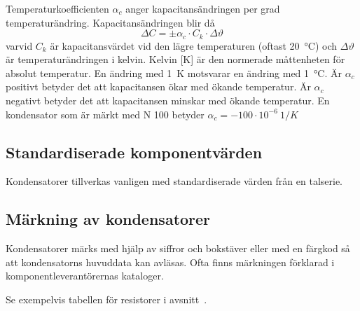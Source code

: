 Temperaturkoefficienten \(\alpha _c\) anger kapacitansändringen per grad temperaturändring.
Kapacitansändringen blir då
\[\Delta C = \pm \alpha _c \cdot C_k \cdot \Delta\vartheta\]
varvid \(C_k\) är kapacitansvärdet vid den lägre temperaturen (oftast
\qty{20}{\degreeCelsius}) och \(\Delta\vartheta\) är temperaturändringen i
kelvin.
Kelvin [K] är den normerade måttenheten för absolut temperatur.
En ändring med \qty{1}{\kelvin} motsvarar en ändring med \qty{1}{\degreeCelsius}.
Är \(\alpha _c\) positivt betyder det att kapacitansen ökar med ökande
temperatur.
Är \(\alpha _c\) negativt betyder det att kapacitansen minskar med ökande
temperatur.
En kondensator som är märkt med N 100 betyder
\(\alpha _c = -100 \cdot 10^{-6}\ 1/K\)

\subsection{Standardiserade komponentvärden}

Kondensatorer tillverkas vanligen med standardiserade värden från en talserie.

\subsection{Märkning av kondensatorer}

Kondensatorer märks med hjälp av siffror och bokstäver eller med en färgkod så
att kondensatorns huvuddata kan avläsas.
Ofta finns märkningen förklarad i komponentleverantörernas kataloger.

Se exempelvis tabellen för resistorer i avsnitt~.
